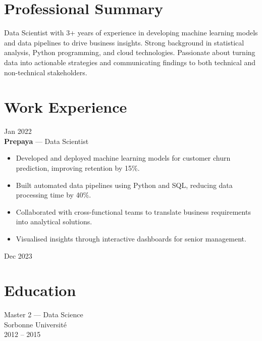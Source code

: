 \documentclass[10pt,letterpaper]{article}
\begin{document}
\begin{paracol}{2}
\begin{rightcolumn}
\section*{Professional Summary}
Data Scientist with 3+ years of experience in developing machine learning models and data pipelines to drive business insights. Strong background in statistical analysis, Python programming, and cloud technologies. Passionate about turning data into actionable strategies and communicating findings to both technical and non-technical stakeholders.

\vspace{1in}
\section*{Work Experience}

\begin{tcolorbox}
  \begin{minipage}[t]{0.48\linewidth}
    Jan 2022\\
    \textbf{Prepaya} --- Data Scientist\\
    \begin{itemize}
      \item Developed and deployed machine learning models for customer churn prediction, improving retention by 15\%.
      \item Built automated data pipelines using Python and SQL, reducing data processing time by 40\%.
      \item Collaborated with cross-functional teams to translate business requirements into analytical solutions.
      \item Visualised insights through interactive dashboards for senior management.
    \end{itemize}
  \end{minipage}\hfill
  \begin{minipage}[t]{0.48\linewidth}\raggedleft
    Dec 2023
  \end{minipage}
\end{tcolorbox}

\vspace{0.9in}
\section*{Education}
\begin{tcolorbox}[colback=white,boxrule=1pt,colframe=primary]
  Master 2 — Data Science\\
  Sorbonne Université\\
  2012 – 2015
\end{tcolorbox}


\end{rightcolumn}
\end{paracol}
\end{document}
